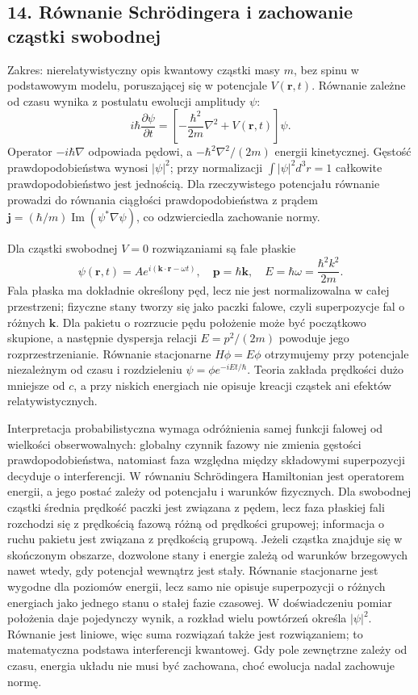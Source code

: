 \documentclass[11pt,a4paper]{article}
\begin{document}
\subsection{14. Równanie Schrödingera i zachowanie cząstki swobodnej}
Zakres: nierelatywistyczny opis kwantowy cząstki masy \(m\), bez spinu w podstawowym modelu, poruszającej się w potencjale \(V(\mathbf r,t)\). Równanie zależne od czasu wynika z postulatu ewolucji amplitudy \(\psi\):
\[
i\hbar\frac{\partial\psi}{\partial t}
=\left[-\frac{\hbar^2}{2m}\nabla^2+V(\mathbf r,t)\right]\psi.
\]
Operator \(-i\hbar\nabla\) odpowiada pędowi, a \(-\hbar^2\nabla^2/(2m)\) energii kinetycznej. Gęstość prawdopodobieństwa wynosi \(|\psi|^2\); przy normalizacji \(\int|\psi|^2d^3r=1\) całkowite prawdopodobieństwo jest jednością. Dla rzeczywistego potencjału równanie prowadzi do równania ciągłości prawdopodobieństwa z prądem \(\mathbf j=(\hbar/m)\operatorname{Im}(\psi^*\nabla\psi)\), co odzwierciedla zachowanie normy.

Dla cząstki swobodnej \(V=0\) rozwiązaniami są fale płaskie
\[
\psi(\mathbf r,t)=A e^{i(\mathbf k\cdot\mathbf r-\omega t)},\quad
\mathbf p=\hbar\mathbf k,\quad E=\hbar\omega=\frac{\hbar^2k^2}{2m}.
\]
Fala płaska ma dokładnie określony pęd, lecz nie jest normalizowalna w całej przestrzeni; fizyczne stany tworzy się jako paczki falowe, czyli superpozycje fal o różnych \(\mathbf k\). Dla pakietu o rozrzucie pędu położenie może być początkowo skupione, a następnie dyspersja relacji \(E=p^2/(2m)\) powoduje jego rozprzestrzenianie. Równanie stacjonarne \(H\phi=E\phi\) otrzymujemy przy potencjale niezależnym od czasu i rozdzieleniu \(\psi=\phi e^{-iEt/\hbar}\). Teoria zakłada prędkości dużo mniejsze od \(c\), a przy niskich energiach nie opisuje kreacji cząstek ani efektów relatywistycznych.

Interpretacja probabilistyczna wymaga odróżnienia samej funkcji falowej od wielkości obserwowalnych: globalny czynnik fazowy nie zmienia gęstości prawdopodobieństwa, natomiast faza względna między składowymi superpozycji decyduje o interferencji. W równaniu Schrödingera Hamiltonian jest operatorem energii, a jego postać zależy od potencjału i warunków fizycznych. Dla swobodnej cząstki średnia prędkość paczki jest związana z pędem, lecz faza płaskiej fali rozchodzi się z prędkością fazową różną od prędkości grupowej; informacja o ruchu pakietu jest związana z prędkością grupową. Jeżeli cząstka znajduje się w skończonym obszarze, dozwolone stany i energie zależą od warunków brzegowych nawet wtedy, gdy potencjał wewnątrz jest stały. Równanie stacjonarne jest wygodne dla poziomów energii, lecz samo nie opisuje superpozycji o różnych energiach jako jednego stanu o stałej fazie czasowej. W doświadczeniu pomiar położenia daje pojedynczy wynik, a rozkład wielu powtórzeń określa \(|\psi|^2\). Równanie jest liniowe, więc suma rozwiązań także jest rozwiązaniem; to matematyczna podstawa interferencji kwantowej. Gdy pole zewnętrzne zależy od czasu, energia układu nie musi być zachowana, choć ewolucja nadal zachowuje normę.
\end{document}
